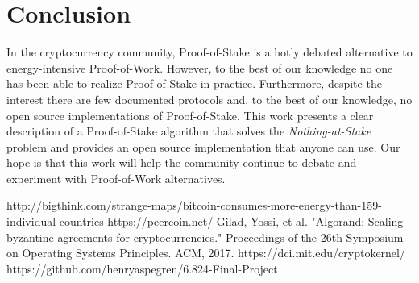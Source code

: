 \documentclass{article}
\begin{document}
\section{Conclusion}
In the cryptocurrency community, Proof-of-Stake is a hotly debated alternative to energy-intensive Proof-of-Work. However, to the best of our knowledge no one has been able to realize Proof-of-Stake in practice. Furthermore, despite the interest there are few documented protocols and, to the best of our knowledge, no open source implementations of Proof-of-Stake. This work presents a clear description of a Proof-of-Stake algorithm that solves the \textit{Nothing-at-Stake} problem and provides an open source implementation that anyone can use. Our hope is that this work will help the community continue to debate and experiment with Proof-of-Work alternatives.    


\begin{thebibliography}{9}
http://bigthink.com/strange-maps/bitcoin-consumes-more-energy-than-159-individual-countries
https://peercoin.net/
Gilad, Yossi, et al. "Algorand: Scaling byzantine agreements for cryptocurrencies." Proceedings of the 26th Symposium on Operating Systems Principles. ACM, 2017.
https://dci.mit.edu/cryptokernel/
https://github.com/henryaspegren/6.824-Final-Project
\end{thebibliography}
\end{document}
